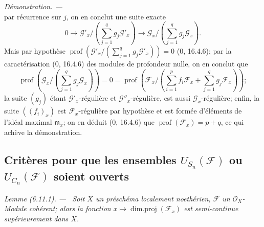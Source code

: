 \documentclass[10pt,oneside]{book}
\newenvironment{lemma}[1][]{%
  \par\medskip\noindent\itshape Lemme (#1). ---\ }{\par}
\newenvironment{proof}{%
  \par\medskip\noindent\textit{Démonstration. ---\ }}{\par}
\begin{document}
\begin{proof}
\[\]
par récurrence sur $j$, on en conclut une suite exacte
\[
0\longrightarrow\mathcal G'_x/
\left(\sum_{j=1}^{q}g_j\mathcal G'_x\right)
\longrightarrow\mathcal G_x/
\left(\sum_{j=1}^{q}g_j\mathcal G_x\right).
\]
Mais par hypothèse
$\operatorname{prof}(\mathcal G'_x/(\sum_{j=1}^{q}g_j\mathcal G'_x))=0$
(0, 16.4.6); par la caractérisation (0, 16.4.6) des modules de profondeur
nulle, on en conclut que
\[
\operatorname{prof}\left(\mathcal G_x/
\left(\sum_{j=1}^{q}g_j\mathcal G_x\right)\right)=0
=\operatorname{prof}\left(\mathcal F_x/
\left(\sum_{i=1}^{p}f_i\mathcal F_x+
\sum_{j=1}^{q}g_j\mathcal F_x\right)\right);
\]
la suite $(g_j)$ étant $\mathcal G'_x$-régulière et
$\mathcal G''_x$-régulière, est aussi $\mathcal G_x$-régulière; enfin, la
suite $((f_i)_x)$ est $\mathcal F_x$-régulière par hypothèse et est formée
d'éléments de l'idéal maximal $\mathfrak m_x$; on en déduit (0, 16.4.6)
que $\operatorname{prof}(\mathcal F_x)=p+q$, ce qui achève la
démonstration.
\end{proof}

\subsection{\texorpdfstring{Critères pour que les ensembles
$U_{S_n}(\mathcal F)$ ou $U_{C_n}(\mathcal F)$ soient ouverts}{Critères pour que les ensembles U\string_(F) ou U\string_(F) soient ouverts}}
\label{IV.2.s6.11-fr}

\begin{lemma}[6.11.1]
\label{IV.2.s6.11.1-fr}
Soit $X$ un préschéma localement noethérien, $\mathcal F$ un
$\mathcal O_X$-Module cohérent; alors la fonction
$x\mapsto\operatorname{dim.proj}(\mathcal F_x)$ est semi-continue
supérieurement dans $X$.
\end{lemma}
\end{document}
